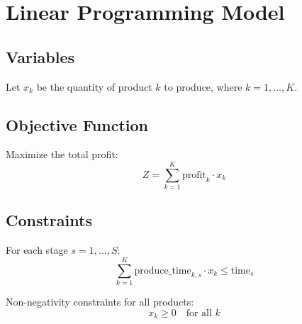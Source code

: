\documentclass{article}
\begin{document}
\section*{Linear Programming Model}

\subsection*{Variables}
Let \( x_k \) be the quantity of product \( k \) to produce, where \( k = 1, \ldots, K \).

\subsection*{Objective Function}
Maximize the total profit:
\[
Z = \sum_{k=1}^{K} \text{profit}_k \cdot x_k 
\]

\subsection*{Constraints}
For each stage \( s = 1, \ldots, S \):
\[
\sum_{k=1}^{K} \text{produce\_time}_{k, s} \cdot x_k \leq \text{time}_s
\]

Non-negativity constraints for all products:
\[
x_k \geq 0 \quad \text{for all } k
\]
\end{document}

